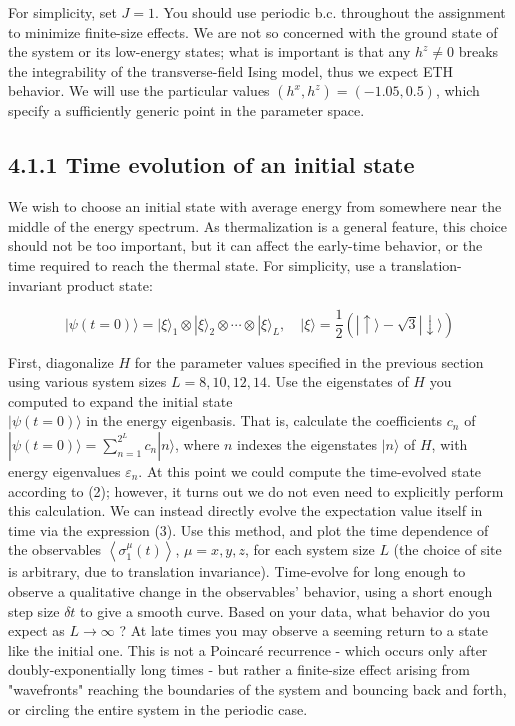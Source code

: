 \documentclass[12pt]{article}
\begin{document}
For simplicity, set $J=1$. You should use periodic b.c. throughout the assignment to minimize finite-size effects. We are not so concerned with the ground state of the system or its low-energy states; what is important is that any $h^{z} \neq 0$ breaks the integrability of the transverse-field Ising model, thus we expect ETH behavior. We will use the particular values $\left(h^{x}, h^{z}\right)=(-1.05,0.5)$, which specify a sufficiently generic point in the parameter space.

\subsection*{4.1.1 Time evolution of an initial state}
We wish to choose an initial state with average energy from somewhere near the middle of the energy spectrum. As thermalization is a general feature, this choice should not be too important, but it can affect the early-time behavior, or the time required to reach the thermal state. For simplicity, use a translation-invariant product state:


\begin{equation*}
|\psi(t=0)\rangle=|\xi\rangle_{1} \otimes|\xi\rangle_{2} \otimes \cdots \otimes|\xi\rangle_{L}, \quad|\xi\rangle=\frac{1}{2}(|\uparrow\rangle-\sqrt{3}|\downarrow\rangle) \tag{9}
\end{equation*}


First, diagonalize $H$ for the parameter values specified in the previous section using various system sizes $L=8,10,12,14$. Use the eigenstates of $H$ you computed to expand the initial state\\
$|\psi(t=0)\rangle$ in the energy eigenbasis. That is, calculate the coefficients $c_{n}$ of $|\psi(t=0)\rangle=\sum_{n=1}^{2^{L}} c_{n}|n\rangle$, where $n$ indexes the eigenstates $|n\rangle$ of $H$, with energy eigenvalues $\varepsilon_{n}$. At this point we could compute the time-evolved state according to (2); however, it turns out we do not even need to explicitly perform this calculation. We can instead directly evolve the expectation value itself in time via the expression (3). Use this method, and plot the time dependence of the observables $\left\langle\sigma_{1}^{\mu}(t)\right\rangle$, $\mu=x, y, z$, for each system size $L$ (the choice of site is arbitrary, due to translation invariance). Time-evolve for long enough to observe a qualitative change in the observables' behavior, using a short enough step size $\delta t$ to give a smooth curve. Based on your data, what behavior do you expect as $L \rightarrow \infty$ ? At late times you may observe a seeming return to a state like the initial one. This is not a Poincaré recurrence - which occurs only after doubly-exponentially long times - but rather a finite-size effect arising from "wavefronts" reaching the boundaries of the system and bouncing back and forth, or circling the entire system in the periodic case.
\end{document}
